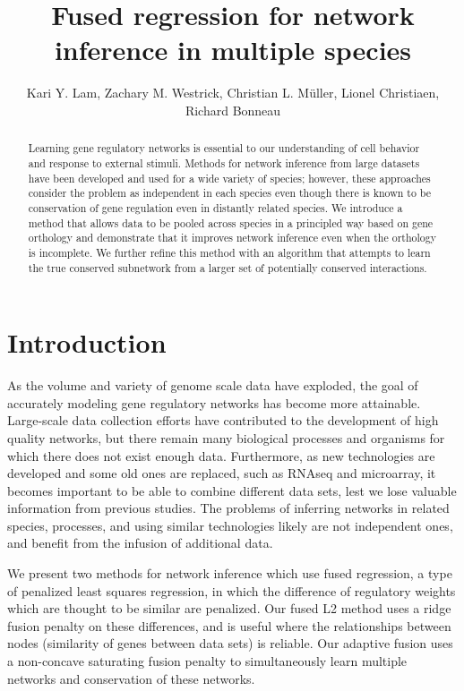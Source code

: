 \documentclass[11pt]{article}
\begin{document}
\title{Fused regression for network inference in multiple species}
\author{Kari Y. Lam, Zachary M. Westrick, Christian L. M\"{u}ller, Lionel Christiaen, Richard Bonneau}
\maketitle

\begin{abstract}
Learning gene regulatory networks is essential to our understanding of cell behavior and response to external stimuli. Methods for network inference from large datasets have been developed and used for a wide variety of species; however, these approaches consider the problem as independent in each species even though there is known to be conservation of gene regulation even in distantly related species. We introduce a method that allows data to be pooled across species in a principled way based on gene orthology and demonstrate that it improves network inference even when the orthology is incomplete. We further refine this method with an algorithm that attempts to learn the true conserved subnetwork from a larger set of potentially conserved interactions. 
\end{abstract}

\section{Introduction}
As the volume and variety of genome scale data have exploded, the goal of accurately modeling gene regulatory networks has become more attainable. Large-scale data collection efforts have contributed to the development of high quality networks, but there remain many biological processes and organisms for which there does not exist enough data. Furthermore, as new technologies are developed and some old ones are replaced, such as RNAseq and microarray, it becomes important to be able to combine different data sets, lest we lose valuable information from previous studies. The problems of inferring networks in related species, processes, and using similar technologies likely are not independent ones, and benefit from the infusion of additional data.

We present two methods for network inference which use fused regression, a type of penalized least squares regression, in which the difference of regulatory weights which are thought to be similar are penalized. Our fused L2 method uses a ridge fusion penalty on these differences, and is useful where the relationships between nodes (similarity of genes between data sets) is reliable. Our adaptive fusion uses a non-concave saturating fusion penalty to simultaneously learn multiple networks and conservation of these networks. 
\end{document}
